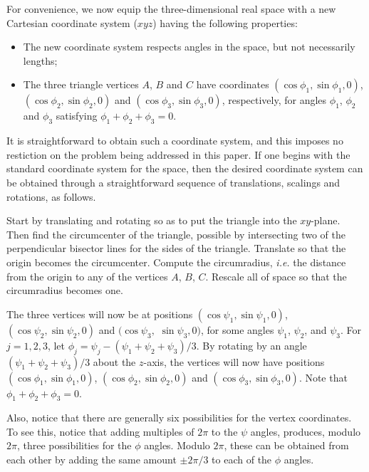 \documentclass[a4paper, twoside]{article}
\begin{document}
For convenience, we now equip the three-dimensional real space with a new Cartesian coordinate system ($xyz$) having the following properties: 

\begin{itemize}

\item The new coordinate system respects angles in the space, but not necessarily lengths; 

\item The three triangle vertices $A$, $B$ and $C$ have coordinates $(\cos \phi_1, \sin \phi_1, 0)$, $(\cos \phi_2, \sin \phi_2, 0)$ and $(\cos \phi_3, \sin \phi_3, 0)$, respectively, for angles $\phi_1$, $\phi_2$ and $\phi_3$ satisfying $\phi_1 + \phi_2 + \phi_3 = 0$.  \\

\end{itemize}  

It is straightforward to obtain such a coordinate system, and this imposes no restiction on the problem being addressed in this paper. If one begins with the standard coordinate system for the space, then the desired coordinate system can be obtained through a straightforward sequence of translations, scalings and rotations, as follows. 

Start by translating and rotating so as to put the triangle into the $xy$-plane. Then find the circumcenter of the triangle, possible by intersecting two of the perpendicular bisector lines for the sides of the triangle. Translate so that the origin becomes the circumcenter. Compute the circumradius, {\it i.e.} the distance from the origin to any of the vertices $A$, $B$, $C$. Rescale all of space so that the circumradius becomes one. 

The three vertices will now be at positions $(\cos\psi_1, \sin\psi_1, 0)$, $(\cos\psi_2, \sin\psi_2, 0)$ and $(\cos\psi_3,$ $\sin\psi_3, 0)$, for some angles $\psi_1$, $\psi_2$, and $\psi_3$. For $j=1,2,3$, let $\phi_j = \psi_j - (\psi_1+\psi_2+\psi_3) / 3$. By rotating by an angle $(\psi_1+\psi_2+\psi_3) / 3$ about the $z$-axis, the vertices will now have positions $(\cos\phi_1, \sin\phi_1, 0)$, $(\cos\phi_2, \sin\phi_2, 0)$ and $(\cos\phi_3, \sin\phi_3, 0)$. Note that $\phi_1+\phi_2+\phi_3 = 0$.

Also, notice that there are generally six possibilities for the vertex coordinates. To see this, notice that adding multiples of $2\pi$ to the $\psi$ angles, produces, modulo $2\pi$, three possibilities for the $\phi$ angles. Modulo $2\pi$, these can be obtained from each other by adding the same amount $\pm 2\pi / 3$ to each of the $\phi$ angles. 
\end{document}
